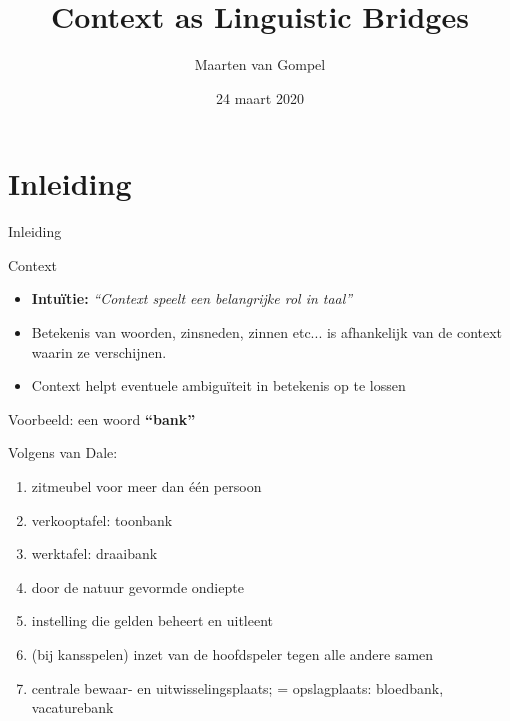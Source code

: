 \documentclass[8pt]{beamer}
\title{\textbf{Co}ntext as \textbf{Li}nguistic \textbf{Bri}dges}
\author{Maarten van Gompel}
\date{\vspace{-10ex} {24 maart 2020}}
\begin{document}
\begin{frame}
	\titlepage
\end{frame}

\section{Inleiding}

\begin{frame}{Inleiding}

	\begin{block}{Context}
        \begin{itemize}
            \item \textbf{Intuïtie:} \emph{``Context speelt een belangrijke rol in taal''}
            \item Betekenis van woorden, zinsneden, zinnen etc... is afhankelijk van de context waarin ze verschijnen.
            \item Context helpt eventuele ambiguïteit in betekenis op te lossen
        \end{itemize}
	\end{block}

    \begin{block}{Voorbeeld: een woord}
        {\Large\textbf{``bank''}}

        Volgens van Dale:
        \begin{enumerate}
            \item zitmeubel voor meer dan één persoon
            \item verkooptafel: toonbank
            \item werktafel: draaibank
            \item door de natuur gevormde ondiepte
            \item instelling die gelden beheert en uitleent
            \item (bij kansspelen) inzet van de hoofdspeler tegen alle andere samen
            \item centrale bewaar- en uitwisselingsplaats; = opslagplaats: bloedbank, vacaturebank
        \end{enumerate}
    \end{block}
\end{frame}
\end{document}
